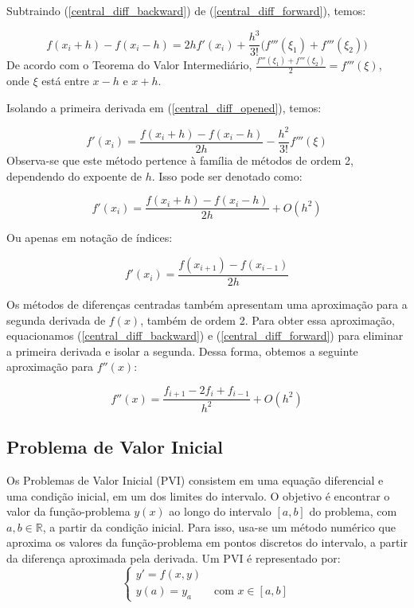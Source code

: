 Subtraindo (\ref{central_diff_backward}) de (\ref{central_diff_forward}), temos:

\begin{equation}\label{central_diff_opened}
f(x_i+h) - f(x_i-h) = 2hf'(x_i) + \frac{h^3}{3!}\big(f'''(\xi_1) + f'''(\xi_2)\big)
\end{equation}
De acordo com o Teorema do Valor Intermediário, $\frac{f'''(\xi_1)+ f'''(\xi_2)}{2}= f'''(\xi)$, onde $\xi$ está entre $x-h$ e $x+h$.

Isolando a primeira derivada em (\ref{central_diff_opened}), temos:

\begin{equation*}
f'(x_i)= \frac{f(x_i+h)-f(x_i-h)}{2h} - \frac{h^2}{3!}f'''(\xi)
\end{equation*}
Observa-se que este método pertence à família de métodos de ordem 2, dependendo do expoente de $h$. Isso pode ser denotado como:

\begin{equation*}
f'(x_i)= \frac{f(x_i+h)-f(x_i-h)}{2h} +O(h^2)
\end{equation*}

Ou apenas em notação de índices:

\begin{equation}\label{central_difference}
f'(x_i)= \frac{f(x_{i+1})-f(x_{i-1})}{2h}
\end{equation}

Os métodos de diferenças centradas também apresentam uma aproximação para a segunda derivada de $f(x)$, também de ordem 2. Para obter essa aproximação, equacionamos (\ref{central_diff_backward}) e (\ref{central_diff_forward}) para eliminar a primeira derivada e isolar a segunda. Dessa forma, obtemos a seguinte aproximação para $f''(x)$:

\begin{equation*}\label{cd_2nd_derivative}
	f''(x) = \frac{f_{i+1}  - 2f_{i} + f_{i-1}}{h^2} + O(h^2)
\end{equation*}


\subsection{Problema de Valor Inicial}\label{sec:ivp}
Os Problemas de Valor Inicial (PVI) consistem em uma equação diferencial e uma condição inicial, em um dos limites do intervalo. O objetivo é encontrar o valor da função-problema $y(x)$ ao longo do intervalo $[a, b]$ do problema, com $a, b \in \mathbb{R}$, a partir da condição inicial. Para isso, usa-se um método numérico que aproxima os valores da função-problema em pontos discretos do intervalo, a partir da diferença aproximada pela derivada. Um PVI é representado por:
\begin{equation*}
	\begin{cases}
		y' = f(x,y) &                           \\
		y(a) = y_a  & \text{ com } x \in [a, b] 
	\end{cases}
\end{equation*}

